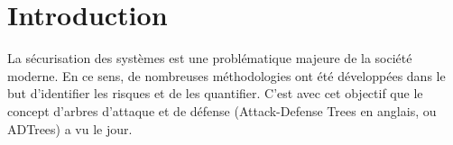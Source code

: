 \section{Introduction}
	\label{sec:intro}








La sécurisation des systèmes est une problématique majeure de la société moderne. En ce sens, de nombreuses méthodologies ont été développées dans le but d'identifier les risques et de les quantifier. C'est avec cet objectif que le concept d'arbres d'attaque et de défense (\og Attack-Defense Trees \fg{} en anglais, ou ADTrees) a vu le jour.

